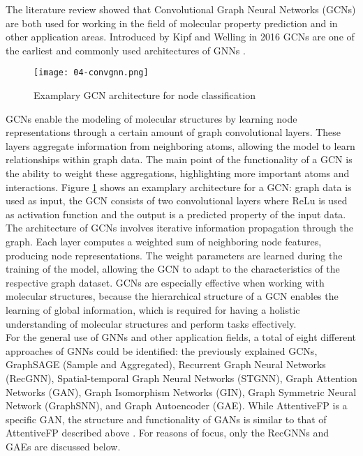 The literature review showed that Convolutional Graph Neural Networks (GCNs) are both used for working in the field of molecular property prediction and in other application areas. Introduced by Kipf and Welling in 2016 \cite{kipf2016semi} GCNs are one of the earliest and commonly used architectures of GNNs \cite{wu_comprehensive_2021}. 

\begin{figure}[h]
    \centering
    \texttt{[image: 04-convgnn.png]}
    \caption[Examplary GCN architecture for node classification]{\label{img:paper01gcn}{Examplary GCN architecture for node classification \cite{wu_comprehensive_2021}}}
\end{figure} 

GCNs enable the modeling of molecular structures by learning node representations through a certain amount of graph convolutional layers. These layers aggregate information from neighboring atoms, allowing the model to learn relationships within graph data. The main point of the functionality of a GCN is the ability to weight these aggregations, highlighting more important atoms and interactions. \cite{zhang2019graph} Figure \ref{img:paper01gcn} shows an examplary architecture for a GCN: graph data is used as input, the GCN consists of two convolutional layers where ReLu is used as activation function and the output is a predicted property of the input data. \\
The architecture of GCNs involves iterative information propagation through the graph. Each layer computes a weighted sum of neighboring node features, producing node representations. The weight parameters are learned during the training of the model, allowing the GCN to adapt to the characteristics of the respective graph dataset. GCNs are especially effective when working with molecular structures, because the hierarchical structure of a GCN enables the learning of global information, which is required for having a holistic understanding of molecular structures and perform tasks effectively. \cite{wu_comprehensive_2021, zhang2019graph} \\

For the general use of GNNs and other application fields, a total of eight different approaches of GNNs could be identified: the previously explained GCNs, GraphSAGE (Sample and Aggregated), Recurrent Graph Neural Networks (RecGNN), Spatial-temporal Graph Neural Networks (STGNN), Graph Attention Networks (GAN), Graph Isomorphism Networks (GIN), Graph Symmetric Neural Network (GraphSNN),  and Graph Autoencoder (GAE). While AttentiveFP is a specific GAN, the structure and functionality of GANs is similar to that of AttentiveFP described above \cite{xiong_pushing_2019}. For reasons of focus, only the RecGNNs and GAEs are discussed below. \\

